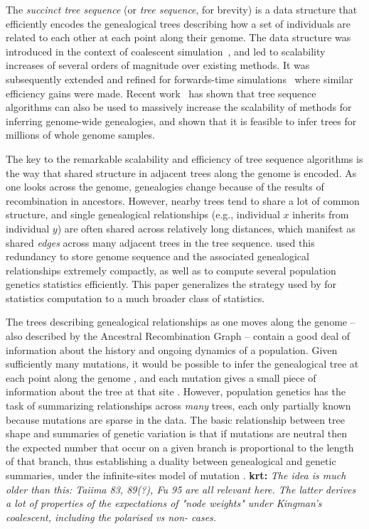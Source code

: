 \documentclass{article}
\newcommand{\krt}[1]{{\color{green}\textbf{krt:} \it #1}}
\begin{document}
The \emph{succinct tree sequence} (or \emph{tree sequence}, for brevity) is a data
structure that efficiently encodes the genealogical trees describing how a set of
individuals are related to each other at each point along their genome. The
data structure was introduced in the context of coalescent
simulation~\citep{kelleher2016efficient}, and led to scalability increases of
several orders of magnitude over existing methods. It was subsequently extended
and refined for forwards-time simulations~\citep{kelleher2018efficient,haller2018tree}
where similar efficiency gains were made. Recent
work~\citep{kelleher2018inferring} has shown that tree sequence algorithms can
also be used to massively increase the scalability of methods for inferring
genome-wide genealogies, and shown that it is feasible to infer trees for
millions of whole genome samples.

The key to the remarkable scalability and efficiency of tree sequence
algorithms is the way that shared structure in adjacent trees along the genome is encoded.
As one looks across the genome, genealogies change because of the results of recombination in ancestors.
However, nearby trees tend to share a lot of common structure,
and single genealogical relationships (e.g., individual $x$ inherits from individual $y$)
are often shared across relatively long distances,
which manifest as shared \emph{edges} across many adjacent trees in the tree sequence.
\citep{kelleher2016efficient} used this redundancy
to store genome sequence and the associated genealogical relationships extremely compactly,
as well as to compute several population genetics statistics efficiently.
This paper generalizes the strategy used by \citep{kelleher2016efficient} for statistics computation
to a much broader class of statistics.

The trees describing genealogical relationships as one moves along the genome
-- also described by the Ancestral Recombination Graph \citep[][or ARG,]{arg} --
contain a good deal of information about the history and ongoing dynamics of a population.
Given sufficiently many mutations, it would be possible to infer the genealogical tree
at each point along the genome \citep{felsenstein_book},
and each mutation gives a small piece of information about the tree at that site
\citep{semple2003phylogenetics}.
However, population genetics has the task of summarizing relationships across \emph{many} trees,
each only partially known because mutations are sparse in the data.
The basic relationship between tree shape and summaries of genetic variation
is that if mutations are neutral then the expected number that occur on a given branch
is proportional to the length of that branch,
thus establishing a duality between genealogical and genetic summaries,
under the infinite-sites model of mutation \citep{ralph2019empirical}.
\krt{The idea is much older than this: Taiima 83, 89(?), Fu 95 are all relevant here.  The latter
derives a lot of properties of the expectations of "node weights" under Kingman's coalescent, including
the polarised vs non- cases.}
\end{document}
